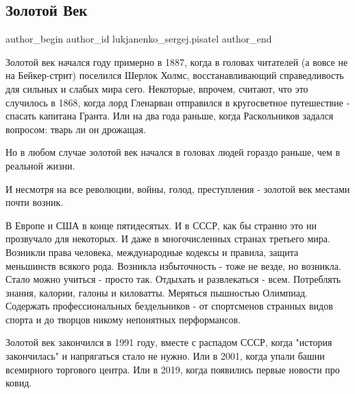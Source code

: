  
 
 
 
 
 
\subsection{Золотой Век}
\label{sec:26_11_2021.fb.lukjanenko_sergej.pisatel.1.zolotoj_vek}
 
\ifcmt
 author_begin
   author_id lukjanenko_sergej.pisatel
 author_end
\fi

Золотой век начался году примерно в 1887, когда в головах читателей (а вовсе не
на Бейкер-стрит) поселился Шерлок Холмс, восстанавливающий справедливость для
сильных и слабых мира сего. Некоторые, впрочем, считают, что это случилось в
1868, когда лорд Гленарван отправился в кругосветное путешествие - спасать
капитана Гранта. Или на два года раньше, когда Раскольников задался вопросом:
тварь ли он дрожащая.

Но в любом случае золотой век начался в головах людей гораздо раньше, чем в
реальной жизни.

И несмотря на все революции, войны, голод, преступления - золотой век местами
почти возник.

В Европе и США в конце пятидесятых. И в СССР, как бы странно это ни прозвучало
для некоторых. И даже в многочисленных странах третьего мира. Возникли права
человека, международные кодексы и правила, защита меньшинств всякого рода.
Возникла избыточность - тоже не везде, но возникла. Стало можно учиться -
просто так. Отдыхать и развлекаться - всем. Потреблять знания, калории, галоны
и киловатты. Меряться пышностью Олимпиад. Содержать профессиональных
бездельников - от спортсменов странных видов спорта и до творцов никому
непонятных перформансов.

Золотой век закончился в 1991 году, вместе с распадом СССР, когда "история
закончилась" и напрягаться стало не нужно. Или в 2001, когда упали башни
всемирного торгового центра. Или в 2019, когда появились первые новости про
ковид.

